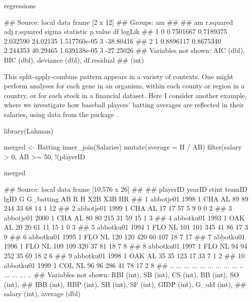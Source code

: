 \begin{example}
regressions %
\end{example}

\begin{example}
## Source: local data frame [2 x 12]
## Groups: am
## 
##   am r.squared adj.r.squared    sigma statistic      p.value df    logLik
## 1  0 0.7501667     0.7189375 2.032590  24.02135 1.517760e-05  3 -38.80416
## 2  1 0.8896117     0.8675340 2.244353  40.29465 1.639138e-05  3 -27.25026
## Variables not shown: AIC (dbl), BIC (dbl), deviance (dbl), df.residual
##   (int)

\end{example}


This split-apply-combine pattern appears in a variety of contexts. One might perform analyses for each gene in an organism, within each county or region in a country, or for each stock in a financial dataset. Here I consider another example, where we investigate how baseball players' batting averages are reflected in their salaries, using data from the  package \citep{package:Lahman}.


\begin{example}
library(Lahman)
\end{example}

\begin{example}
merged <- Batting %
    inner_join(Salaries) %
    mutate(average = H / AB) %
    filter(salary > 0, AB >= 50, !(playerID %
\end{example}

\begin{example}
merged
\end{example}

\begin{example}
## Source: local data frame [10,576 x 26]
## 
##     playerID yearID stint teamID lgID   G G_batting  AB  R   H X2B X3B HR
## 1  abbotje01   1998     1    CHA   AL  89        89 244 33  68  14   1 12
## 2  abbotje01   1999     1    CHA   AL  17        17  57  5   9   0   0  2
## 3  abbotje01   2000     1    CHA   AL  80        80 215 31  59  15   1  3
## 4  abbotku01   1993     1    OAK   AL  20        20  61 11  15   1   0  3
## 5  abbotku01   1994     1    FLO   NL 101       101 345 41  86  17   3  9
## 6  abbotku01   1995     1    FLO   NL 120       120 420 60 107  18   7 17
## 7  abbotku01   1996     1    FLO   NL 109       109 320 37  81  18   7  8
## 8  abbotku01   1997     1    FLO   NL  94        94 252 35  69  18   2  6
## 9  abbotku01   1998     1    OAK   AL  35        35 123 17  33   7   1  2
## 10 abbotku01   1999     1    COL   NL  96        96 286 41  78  17   2  8
## ..       ...    ...   ...    ...  ... ...       ... ... .. ... ... ... ..
## Variables not shown: RBI (int), SB (int), CS (int), BB (int), SO (int),
##   IBB (int), HBP (int), SH (int), SF (int), GIDP (int), G_old (int),
##   salary (int), average (dbl)

\end{example}


